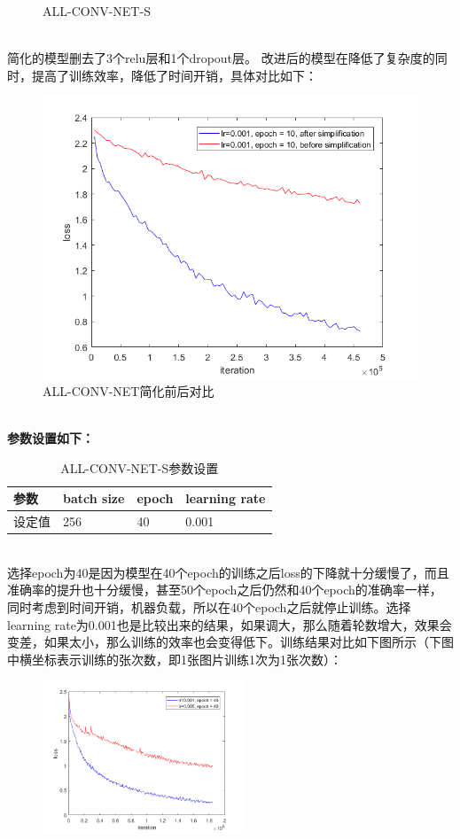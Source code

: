 \documentclass[a4paper,UTF8]{article}
\numberwithin{equation}{section}
\begin{document}
\begin{enumerate}
\begin{figure}[!h]
	\caption{ALL-CONV-NET-S} 
	\label{ng2}
\end{figure}\\
简化的模型删去了3个relu层和1个dropout层。
改进后的模型在降低了复杂度的同时，提高了训练效率，降低了时间开销，具体对比如下：
\begin{figure}[!h]
	\centering   
	\includegraphics[scale=0.5]{after-before-simplification.png}  
	\caption{ALL-CONV-NET简化前后对比} 
	\label{acn0}
\end{figure}\\
\textbf{参数设置如下：}
\begin{table}[h]
	\centering
	\caption{ALL-CONV-NET-S参数设置}
	\label{acn1}
	\begin{tabular}{|l|l|l|l|}
		\hline
	参数	& batch size & epoch & learning rate \\ \hline
	设定值	& 256 & 40 & 0.001 \\ \hline
	\end{tabular}
\end{table}\\
选择epoch为40是因为模型在40个epoch的训练之后loss的下降就十分缓慢了，而且准确率的提升也十分缓慢，甚至50个epoch之后仍然和40个epoch的准确率一样，同时考虑到时间开销，机器负载，所以在40个epoch之后就停止训练。选择learning rate为0.001也是比较出来的结果，如果调大，那么随着轮数增大，效果会变差，如果太小，那么训练的效率也会变得低下。训练结果对比如下图所示（下图中横坐标表示训练的张次数，即1张图片训练1次为1张次数）：
\begin{figure}[htbp]
	\centering
	\begin{minipage}[t]{0.48\textwidth}
		\centering
		\includegraphics[width=6cm]{acns-001-005-40.png}

\end{minipage}
\end{figure}
\end{enumerate}
\end{document}
